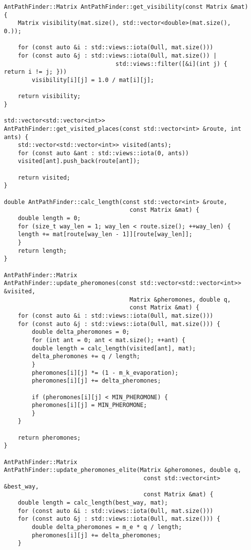 \begin{lstlisting}[caption={Реализация муравьиного алгоритма},label=lst:ant]
AntPathFinder::Matrix AntPathFinder::get_visibility(const Matrix &mat) {
    Matrix visibility(mat.size(), std::vector<double>(mat.size(), 0.));

    for (const auto &i : std::views::iota(0ull, mat.size()))
    for (const auto &j : std::views::iota(0ull, mat.size()) |
                                std::views::filter([&i](int j) { return i != j; }))
        visibility[i][j] = 1.0 / mat[i][j];

    return visibility;
}

std::vector<std::vector<int>>
AntPathFinder::get_visited_places(const std::vector<int> &route, int ants) {
    std::vector<std::vector<int>> visited(ants);
    for (const auto &ant : std::views::iota(0, ants))
    visited[ant].push_back(route[ant]);

    return visited;
}

double AntPathFinder::calc_length(const std::vector<int> &route,
                                    const Matrix &mat) {
    double length = 0;
    for (size_t way_len = 1; way_len < route.size(); ++way_len) {
    length += mat[route[way_len - 1]][route[way_len]];
    }
    return length;
}

AntPathFinder::Matrix
AntPathFinder::update_pheromones(const std::vector<std::vector<int>> &visited,
                                    Matrix &pheromones, double q,
                                    const Matrix &mat) {
    for (const auto &i : std::views::iota(0ull, mat.size()))
    for (const auto &j : std::views::iota(0ull, mat.size())) {
        double delta_pheromones = 0;
        for (int ant = 0; ant < mat.size(); ++ant) {
        double length = calc_length(visited[ant], mat);
        delta_pheromones += q / length;
        }
        pheromones[i][j] *= (1 - m_k_evaporation);
        pheromones[i][j] += delta_pheromones;

        if (pheromones[i][j] < MIN_PHEROMONE) {
        pheromones[i][j] = MIN_PHEROMONE;
        }
    }

    return pheromones;
}

AntPathFinder::Matrix
AntPathFinder::update_pheromones_elite(Matrix &pheromones, double q,
                                        const std::vector<int> &best_way,
                                        const Matrix &mat) {
    double length = calc_length(best_way, mat);
    for (const auto &i : std::views::iota(0ull, mat.size()))
    for (const auto &j : std::views::iota(0ull, mat.size())) {
        double delta_pheromones = m_e * q / length;
        pheromones[i][j] += delta_pheromones;
    }


\end{lstlisting}
